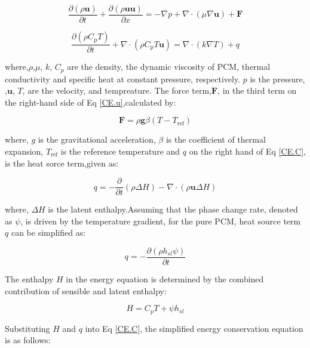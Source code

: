 \begin{equation}\label{CE.u}
	\frac{\partial(\rho \boldsymbol{u})}{\partial t}+\frac{\partial(\rho \boldsymbol{u} \boldsymbol{u})}{\partial x}=-\nabla p+\nabla \cdot(\mu \nabla \boldsymbol{u})+\boldsymbol{F}
\end{equation}

\begin{equation}\label{CE.C}
	\frac{\partial\left(\rho C_{\mathrm{p}} T\right)}{\partial t}+\nabla \cdot\left(\rho C_{\mathrm{p}} T \boldsymbol{u}\right)=\nabla \cdot(k \nabla T)+q
\end{equation}

where,$\rho$,$\mu$, $k$, $C_p$ are the density, the dynamic viscosity of PCM, thermal conductivity and specific heat at constant pressure, respectively. $p$ is the pressure, ,$\boldsymbol{u}$, $T$, are the velocity, and tempreature. 
 The force term,$\boldsymbol{F}$, in the third term on the right-hand side of Eq \ref{CE.u},calculated by:

\begin{equation}\label{F}
\boldsymbol{F}=\rho \mathbf{g} \beta\left(T-T_{\mathrm{ref}}\right)
\end{equation}

where, $g$ is the gravitational acceleration,  $\beta$ is the coefficient of thermal expansion, $T_{\mathrm{ref}}$ is the reference temperature and $q$ on the right hand of Eq \ref{CE.C}, is the heat sorce term,given as:

\begin{equation}\label{q}
q=-\frac{\partial}{\partial t}(\rho \Delta H)-\nabla \cdot(\rho \mathbf{u} \Delta H)
\end{equation}

where, $\Delta H$ is the latent enthalpy.Assuming that the phase change rate, denoted as $\psi$, is driven by the temperature gradient, for the pure PCM, heat source term $q$ can be simplified as:

\begin{equation}\label {deta H}
q=-\frac{\partial\left(\rho h_{s l} \psi\right)}{\partial t}
\end{equation}

The enthalpy  $H$  in the energy equation is determined by the combined contribution of sensible and latent enthalpy:

\begin{equation}\label{H}
H=C_{p} T+\psi h_{s l}
\end{equation}

Substituting $H$ and $q$ into Eq \ref{CE.C}, the simplified energy conservation equation is as follows:

